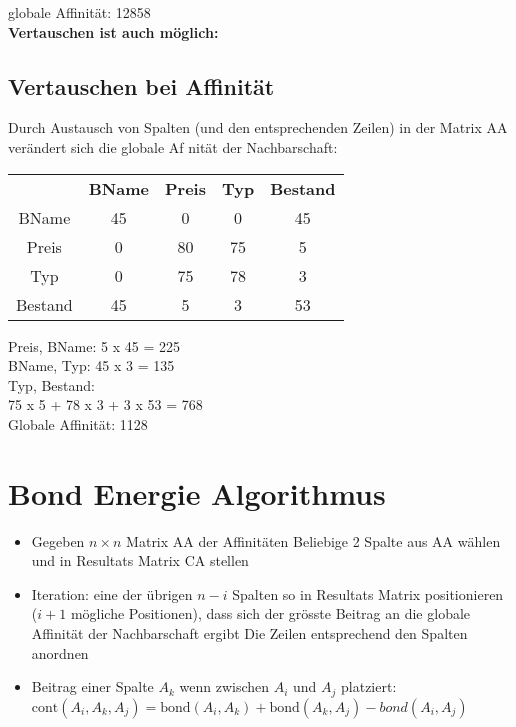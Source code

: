 \documentclass[a4paper,10pt,titlepage=false]{scrreprt}
\begin{document}
globale Affinität: 12858\\

\textbf{Vertauschen ist auch möglich:}

\subsection{Vertauschen bei Affinität}
Durch Austausch von Spalten (und den entsprechenden Zeilen) in
der Matrix AA verändert sich die globale Af nität der
Nachbarschaft:

\begin{tabular}{c c c c c}
  &\textbf{BName} & \textbf{Preis}  & \textbf{Typ} & \textbf{Bestand}\\
BName & 45 & 0 & 0 & 45 \\
Preis & 0 & 80 &75 & 5 \\
Typ & 0 & 75 & 78 & 3 \\
Bestand & 45 & 5 & 3 & 53 \\
\end{tabular}


Preis, BName: 5 x 45 = 225\\
BName, Typ: 45 x 3 = 135\\
Typ, Bestand:\\
75 x 5 + 78 x 3 + 3 x 53 = 768\\
Globale Affinität: 1128\\

\section{Bond Energie Algorithmus}
\begin{itemize}
\item Gegeben $n \times n$ Matrix AA der Affinitäten
\subitem Beliebige 2 Spalte aus AA wählen und in Resultats Matrix CA stellen
\item Iteration:
\subitem eine der übrigen $n - i$ Spalten so in Resultats Matrix
positionieren ($i + 1$ mögliche Positionen), dass sich der
grösste Beitrag an die globale Affinität der
Nachbarschaft ergibt
\subitem Die Zeilen entsprechend den Spalten anordnen
\item Beitrag einer Spalte $A_k$ wenn zwischen $A_i$ und $A_j$ platziert:\\
$ \text{cont} (A_i , A_k , A_j ) = \text{bond}(A_i , A_k ) + \text{bond}(A_k , A_j ) - bond(A_i , A_j )$
\end{itemize}
\end{document}
